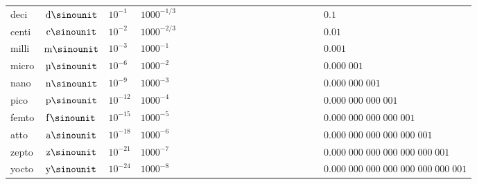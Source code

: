 \begin{tabular}{|l|c|l|l|l|}
    deci  & $\si{\deci\sinounit } $ & ${10}^{ -1}$ & ${1000}^{-1/3}$
          & $\phantom{0\;000\;000\;000\;000\;000\;000\;000\;00} 0.1$ \\ \cline{5-5}
    centi & $\si{\centi\sinounit} $ & ${10}^{ -2}$ & ${1000}^{-2/3}$
          & $\phantom{0\;000\;000\;000\;000\;000\;000\;000\;00} 0.01$ \\ \hline
    milli & $\si{\milli\sinounit} $ & ${10}^{ -3}$ & ${1000}^{-1  }$
          & $\phantom{0\;000\;000\;000\;000\;000\;000\;000\;00} 0.001$ \\ \cline{5-5}
    micro & $\si{\micro\sinounit} $ & ${10}^{ -6}$ & ${1000}^{-2  }$
          & $\phantom{0\;000\;000\;000\;000\;000\;000\;000\;00} 0.000\;001$ \\ \cline{5-5}
    nano  & $\si{\nano\sinounit } $ & ${10}^{ -9}$ & ${1000}^{-3  }$
          & $\phantom{0\;000\;000\;000\;000\;000\;000\;000\;00} 0.000\;000\;001$ \\ \cline{5-5}
    pico  & $\si{\pico\sinounit } $ & ${10}^{-12}$ & ${1000}^{-4  }$
          & $\phantom{0\;000\;000\;000\;000\;000\;000\;000\;00} 0.000\;000\;000\;001$ \\ \cline{5-5}
    femto & $\si{\femto\sinounit} $ & ${10}^{-15}$ & ${1000}^{-5  }$
          & $\phantom{0\;000\;000\;000\;000\;000\;000\;000\;00} 0.000\;000\;000\;000\;001$ \\ \cline{5-5}
    atto  & $\si{\atto\sinounit } $ & ${10}^{-18}$ & ${1000}^{-6  }$
          & $\phantom{0\;000\;000\;000\;000\;000\;000\;000\;00} 0.000\;000\;000\;000\;000\;001$ \\ \cline{5-5}
    zepto & $\si{\zepto\sinounit} $ & ${10}^{-21}$ & ${1000}^{-7  }$
          & $\phantom{0\;000\;000\;000\;000\;000\;000\;000\;00} 0.000\;000\;000\;000\;000\;000\;001$ \\ \cline{5-5}
    yocto & $\si{\yocto\sinounit} $ & ${10}^{-24}$ & ${1000}^{-8  }$
          & $\phantom{0\;000\;000\;000\;000\;000\;000\;000\;00} 0.000\;000\;000\;000\;000\;000\;000\;001$ \\
    \hline
\end{tabular}

